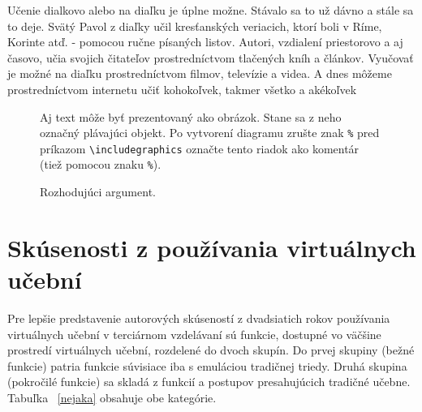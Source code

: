 \documentclass[10pt,twoside,slovak,a4paper]{article}
\begin{document}
Učenie dialkovo alebo na diaľku je úplne možne. Stávalo sa to už dávno a stále sa to deje. Svätý Pavol z diaľky učil kresťanských veriacich,
ktorí boli v Ríme, Korinte atď. - pomocou ručne písaných listov. Autori, vzdialení priestorovo a aj časovo, učia svojich 
čitateľov prostredníctvom tlačených kníh a článkov. Vyučovať je možné na diaľku prostredníctvom 
filmov, televízie a videa. A dnes môžeme prostredníctvom internetu učiť kohokoľvek, takmer všetko a akékoľvek 

\begin{figure}[tbh]
\centering
Aj text môže byť prezentovaný ako obrázok. Stane sa z neho označný plávajúci objekt. Po vytvorení diagramu zrušte znak \texttt{\%} pred príkazom \verb|\includegraphics| označte tento riadok ako komentár (tiež pomocou znaku \texttt{\%}).
\caption{Rozhodujúci argument.}
\end{figure}



\section{Skúsenosti z používania virtuálnych učební} \label{3}

Pre lepšie predstavenie autorových skúseností z dvadsiatich rokov používania virtuálnych učební 
v terciárnom vzdelávaní sú funkcie, dostupné vo väčšine prostredí virtuálnych učební, rozdelené do 
dvoch skupín. Do prvej skupiny (bežné funkcie) patria funkcie súvisiace iba s emuláciou tradičnej triedy. 
Druhá skupina (pokročilé funkcie) sa skladá z funkcií a postupov presahujúcich tradičné učebne.\cite{VCf} 
Tabuľka ~\ref{nejaka} obsahuje obe kategórie.
\end{document}
